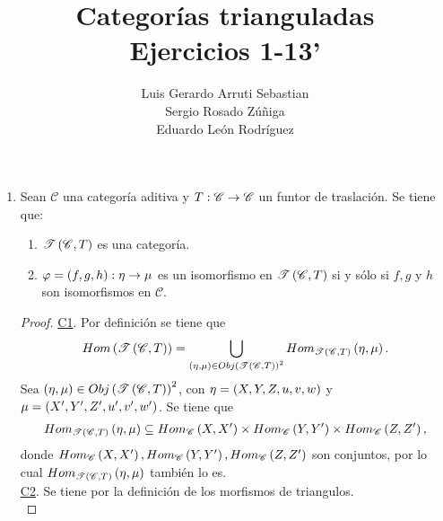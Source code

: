 \documentclass{article}
\title{Categorías trianguladas\\ \large Ejercicios 1-13'}
\author{Luis Gerardo Arruti Sebastian\\ Sergio Rosado Zúñiga\\Eduardo León Rodríguez}
\date{}
\begin{document}
	\maketitle
	\begin{enumerate}[label=\textbf{Ej \arabic*.}]
		\item Sean $\mathscr{C}$ una categoría aditiva y $\catarrow{T}{\mathscr{C}}{\mathscr{C}}{}$ un funtor de traslación. Se tiene que:
		\begin{enumerate}[label=(\textit{\alph*})]
			\item $\mathscr{T}\left(\mathscr{C},T\right)$ es una categoría.
			\item $\catarrow{\varphi=(f,g,h)}{\eta}{\mu}{}$ es un isomorfismo en $\mathscr{T}\left(\mathscr{C},T\right)$ si y sólo si $f,g$ y $h$ son isomorfismos en $\mathscr{C}$.
		\end{enumerate} 
		\begin{proof}
			 \underline{C1}. Por definición se tiene que \begin{equation*}
						Hom\left(\mathscr{T}\left(\mathscr{C},T\right)\right)=\bigcup_{\left(\eta,\mu\right)\in {Obj \left(\mathscr{T} \left(\mathscr{C},T\right) \right) }^2}Hom_{\mathscr{T}\left(\mathscr{C},T\right)}\left(\eta,\mu\right).
			\end{equation*}
		Sea $\left(\eta,\mu\right)\in {Obj \left(\mathscr{T} \left(\mathscr{C},T\right) \right) }^2$, con $\eta=\left(X,Y,Z,u,v,w\right)$ y $\mu=\left(X',Y',Z',u',v',w'\right)$. Se tiene que 
		\begin{align*}
			Hom_{\mathscr{T}\left(\mathscr{C},T\right)}\left(\eta,\mu\right)\subseteq Hom_{\mathscr{C}}\left(X,X'\right)\times Hom_{\mathscr{C}}\left(Y,Y'\right)\times Hom_{\mathscr{C}}\left(Z,Z'\right),
		\end{align*}
		donde $Hom_{\mathscr{C}}\left(X,X'\right), Hom_{\mathscr{C}}\left(Y,Y'\right), Hom_{\mathscr{C}}\left(Z,Z'\right)$ son conjuntos, por lo cual $Hom_{\mathscr{T}\left(\mathscr{C},T\right)}\left(\eta,\mu\right)$ también lo es.\\
		
		\underline{C2}. Se tiene por la definición de los morfismos de triangulos.\\
		

\end{proof}
\end{enumerate}
\end{document}
